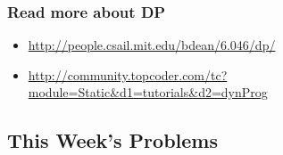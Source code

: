 \documentclass{beamer}
\begin{document}
\begin{frame}
   \frametitle{Read more about DP}
   \begin{itemize}
      \item \url{http://people.csail.mit.edu/bdean/6.046/dp/}
      \item \url{http://community.topcoder.com/tc?module=Static&d1=tutorials&d2=dynProg}
   \end{itemize}
\end{frame}

\subsection{This Week's Problems}


\end{document}

